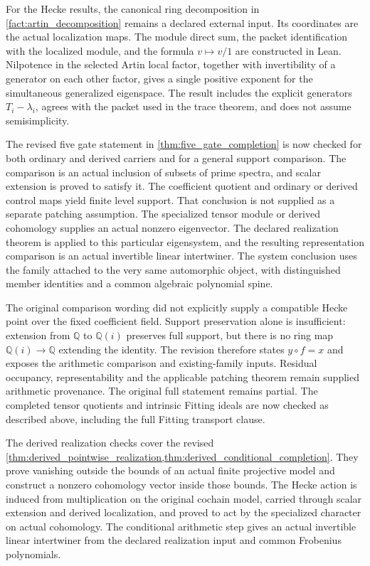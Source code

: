 \documentclass[11pt]{amsart}
\theoremstyle{definition}
\theoremstyle{remark}
\begin{document}
For the Hecke results, the canonical ring decomposition in \cref{fact:artin_decomposition} remains a declared external input. Its coordinates are the actual localization maps. The module direct sum, the packet identification with the localized module, and the formula \(v\mapsto v/1\) are constructed in Lean. Nilpotence in the selected Artin local factor, together with invertibility of a generator on each other factor, gives a single positive exponent for the simultaneous generalized eigenspace. The result includes the explicit generators \(T_i-\lambda_i\), agrees with the packet used in the trace theorem, and does not assume semisimplicity.

The revised five gate statement in \cref{thm:five_gate_completion} is now checked for both ordinary and derived carriers and for a general support comparison. The comparison is an actual inclusion of subsets of prime spectra, and scalar extension is proved to satisfy it. The coefficient quotient and ordinary or derived control maps yield finite level support. That conclusion is not supplied as a separate patching assumption. The specialized tensor module or derived cohomology supplies an actual nonzero eigenvector. The declared realization theorem is applied to this particular eigensystem, and the resulting representation comparison is an actual invertible linear intertwiner. The system conclusion uses the family attached to the very same automorphic object, with distinguished member identities and a common algebraic polynomial spine.

The original comparison wording did not explicitly supply a compatible Hecke point over the fixed coefficient field. Support preservation alone is insufficient: extension from \(\mathbb Q\) to \(\mathbb Q(i)\) preserves full support, but there is no ring map \(\mathbb Q(i)\to\mathbb Q\) extending the identity. The revision therefore states \(y\circ f=x\) and exposes the arithmetic comparison and existing-family inputs. Residual occupancy, representability and the applicable patching theorem remain supplied arithmetic provenance. The original full statement remains partial. The completed tensor quotients and intrinsic Fitting ideals are now checked as described above, including the full Fitting transport clause.

The derived realization checks cover the revised \cref{thm:derived_pointwise_realization,thm:derived_conditional_completion}. They prove vanishing outside the bounds of an actual finite projective model and construct a nonzero cohomology vector inside those bounds. The Hecke action is induced from multiplication on the original cochain model, carried through scalar extension and derived localization, and proved to act by the specialized character on actual cohomology. The conditional arithmetic step gives an actual invertible linear intertwiner from the declared realization input and common Frobenius polynomials.
\end{document}
